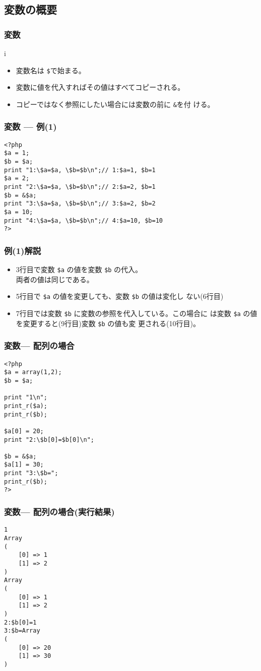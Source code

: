 \subsection{変数の概要}
\begin{frame}[containsverbatim]
\frametitle{変数}
i\begin{itemize}
  \item 変数名は \texttt{\$}で始まる。
  \item 変数に値を代入すればその値はすべてコピーされる。
  \item コピーではなく参照にしたい場合には変数の前に \texttt{\&}を付
ける。
 \end{itemize}
\end{frame}
\begin{frame}[containsverbatim]
\frametitle{変数 --- 例(1)}
\begin{verbatim}
<?php
$a = 1;
$b = $a;
print "1:\$a=$a, \$b=$b\n";// 1:$a=1, $b=1
$a = 2;
print "2:\$a=$a, \$b=$b\n";// 2:$a=2, $b=1
$b = &$a;
print "3:\$a=$a, \$b=$b\n";// 3:$a=2, $b=2
$a = 10;
print "4:\$a=$a, \$b=$b\n";// 4:$a=10, $b=10
?>
\end{verbatim}
\end{frame}
\begin{frame}[containsverbatim]
 \frametitle{例(1)解説}
 \begin{itemize}
  \item 3行目で変数 \verb+$a+ の値を変数 \verb+$b+ の代入。\\
        両者の値は同じである。
  \item 5行目で \verb+$a+ の値を変更しても、変数 \verb+$b+ の値は変化し
        ない(6行目)
  \item 7行目では変数 \verb+$b+ に変数の参照を代入している。この場合に
        は変数 \verb+$a+ の値を変更すると(9行目)変数 \verb+$b+ の値も変
        更される(10行目)。
 \end{itemize}
\end{frame}
\begin{frame}[containsverbatim]
 \frametitle{変数--- 配列の場合}

\begin{verbatim}
<?php
$a = array(1,2);
$b = $a;

print "1\n";
print_r($a);
print_r($b);

$a[0] = 20;
print "2:\$b[0]=$b[0]\n";

$b = &$a;
$a[1] = 30;
print "3:\$b=";
print_r($b);
?>
\end{verbatim}
\end{frame}
\begin{frame}[containsverbatim]
 \frametitle{変数--- 配列の場合(実行結果)}
 {\small
\begin{verbatim}
1
Array
(
    [0] => 1
    [1] => 2
)
Array
(
    [0] => 1
    [1] => 2
)
2:$b[0]=1
3:$b=Array
(
    [0] => 20
    [1] => 30
)
\end{verbatim}
 }
\end{frame}
